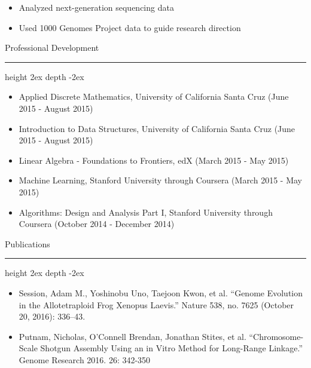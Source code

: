 \documentclass[10pt]{article}
\newcommand\sectionline{\par\leavevmode\leaders\hrule height 2ex depth \dimexpr0.4pt-2ex\hfill\kern0pt\par}
\begin{document}
\begin{itemize}
\item Analyzed next-generation sequencing data
\item Used 1000 Genomes Project data to guide research direction
\end{itemize}

{\Large Professional Development}\sectionline
\begin{itemize}
\item Applied Discrete Mathematics, University of California Santa Cruz (June 2015 - August 2015)
\item Introduction to Data Structures, University of California Santa Cruz (June 2015 - August 2015)
\item Linear Algebra - Foundations to Frontiers, edX (March 2015 - May 2015)
\item Machine Learning, Stanford University through Coursera (March 2015 - May 2015)
\item Algorithms: Design and Analysis Part I, Stanford University through Coursera (October 2014 - December 2014)
\end{itemize}

{\Large Publications}\sectionline
\begin{itemize}
\item Session, Adam M., Yoshinobu Uno, Taejoon Kwon, et al. “Genome Evolution in the Allotetraploid Frog Xenopus
Laevis.” Nature 538, no. 7625 (October 20, 2016): 336–43.
\item Putnam, Nicholas, O’Connell Brendan, Jonathan Stites, et al. “Chromosome-Scale Shotgun Assembly Using an in
Vitro Method for Long-Range Linkage.” Genome Research 2016. 26: 342-350
\end{itemize}
\end{document}
